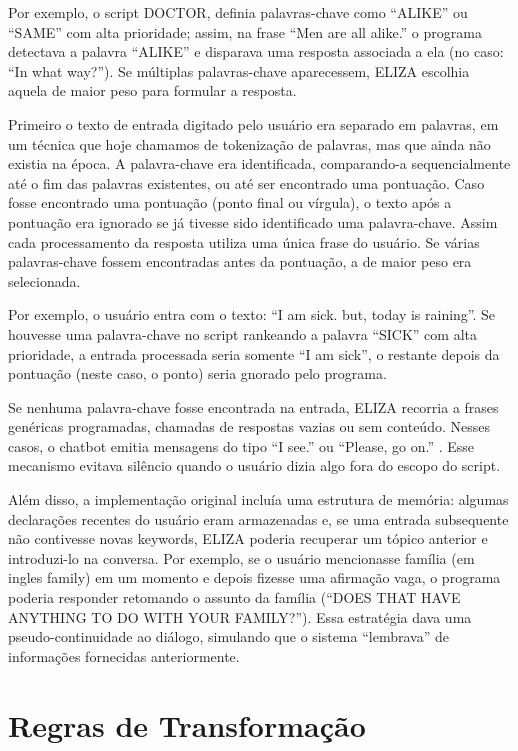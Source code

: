 \documentclass[14pt,a4paper,oneside]{book}
\begin{document}
Por exemplo, o script DOCTOR, definia palavras-chave como “ALIKE” ou “SAME” com alta prioridade; assim, na frase “Men are all alike.” o programa detectava a palavra “ALIKE” e disparava uma resposta associada a ela (no caso: “In what way?”). 
Se múltiplas palavras-chave aparecessem, ELIZA escolhia aquela de maior peso para formular a resposta.

Primeiro o texto de entrada digitado pelo usuário era separado em palavras, em um técnica que hoje chamamos de tokenização de palavras, mas que ainda não existia na época. 
A palavra-chave era identificada, comparando-a sequencialmente até o fim das palavras existentes, ou até ser encontrado uma pontuação. 
Caso fosse encontrado uma pontuação (ponto final ou vírgula), o texto após a pontuação era ignorado se já tivesse sido identificado uma palavra-chave. Assim cada processamento da resposta utiliza uma única frase do usuário. 
Se várias palavras-chave fossem encontradas antes da pontuação, a de maior peso era selecionada.

Por exemplo, o usuário entra com o texto: ``I am sick. but, today is raining''. 
Se houvesse uma palavra-chave no script rankeando a palavra ``SICK'' com alta prioridade, a entrada processada seria somente ``I am sick'', o restante depois da pontuação (neste caso, o ponto) seria gnorado pelo programa.

Se nenhuma palavra-chave fosse encontrada na entrada, ELIZA recorria a frases genéricas programadas, chamadas de respostas vazias ou sem conteúdo. Nesses casos, o chatbot emitia mensagens do tipo ``I see.'' ou ``Please, go on.'' . Esse mecanismo evitava silêncio quando o usuário dizia algo fora do escopo do script.

Além disso, a implementação original incluía uma estrutura de memória: algumas declarações recentes do usuário eram armazenadas e, se uma entrada subsequente não contivesse novas keywords, ELIZA poderia recuperar um tópico anterior e introduzi-lo na conversa.
Por exemplo, se o usuário mencionasse família (em ingles family) em um momento e depois fizesse uma afirmação vaga, o programa poderia responder retomando o assunto da família (“DOES THAT HAVE ANYTHING TO DO WITH YOUR FAMILY?”).
Essa estratégia dava uma pseudo-continuidade ao diálogo, simulando que o sistema “lembrava” de informações fornecidas anteriormente.

\section{Regras de Transformação}
\end{document}
